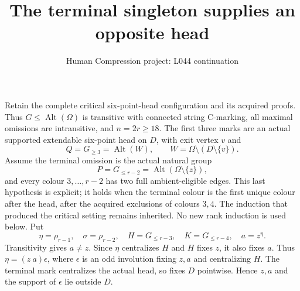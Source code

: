 \documentclass[11pt,a4paper]{article}
\title{The terminal singleton supplies an opposite head}
\author{Human Compression project: L044 continuation}
\date{}
\newcommand{\Alt}{\operatorname{Alt}}
\begin{document}
\maketitle
Retain the complete critical six-point-head configuration and its
acquired proofs. Thus $G\le\Alt(\Omega)$ is transitive with connected
string C-marking, all maximal omissions are intransitive, and
$n=2r\ge18$. The first three marks are an actual supported
extendable six-point head on $D$, with exit vertex $v$ and
\[
          Q=G_{\ge3}=\Alt(W),\qquad
          W=\Omega\setminus(D\setminus\{v\}).
\]
Assume the terminal omission is the actual natural group
\[
          P=G_{\le r-2}=\Alt(\Omega\setminus\{z\}),       \tag{1}
\]
and every colour $3,\ldots,r-2$ has two full ambient-eligible
edges. This last hypothesis is explicit; it holds when the
terminal colour is the first unique colour after the head,
after the acquired exclusions of colours $3,4$.
The induction that produced the critical setting remains inherited.
No new rank induction is used below.
Put
\[
 \eta=\rho_{r-1},\quad \sigma=\rho_{r-2},\quad
 H=G_{\le r-3},\quad K=G_{\le r-4},\quad a=z^\eta.
\]
Transitivity gives $a\ne z$. Since $\eta$ centralizes $H$
and $H$ fixes $z$, it also fixes $a$. Thus
$\eta=(z\ a)\epsilon$, where $\epsilon$ is an odd involution
fixing $z,a$ and centralizing $H$. The terminal mark centralizes
the actual head, so fixes $D$ pointwise. Hence $z,a$ and
the support of $\epsilon$ lie outside $D$.
\end{document}
